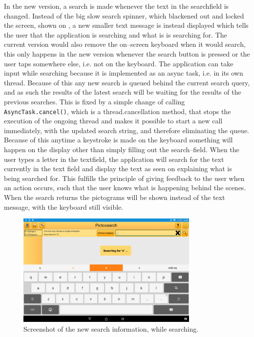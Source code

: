 In the new version, a search is made whenever the text in the searchfield is changed.
Instead of the big slow search spinner, which blackened out and locked the screen, shown on , a new smaller text message is instead displayed which tells the user that the application is searching and what is is searching for.
The current version would also remove the on--screen keyboard when it would search, this only happens in the new version whenever the search button is pressed or the user taps somewhere else, i.e. not on the keyboard.
The application can take input while searching because it is implemented as an async task, i.e. in its own thread.
Because of this any new search is queued behind the current search query, and as such the results of the latest search will be waiting for the results of the previous searches.
This is fixed by a simple change of calling \texttt{AsyncTask.cancel()}, which is a thread.cancellation method, that stops the execution of the ongoing thread and makes it possible to start a new call immediately, with the updated search string, and therefore eliminating the queue.
Because of this anytime a keystroke is made on the keyboard something will happen on the display other than simply filling out the search--field.
When the user types a letter in the textfield, the application will search for the text currently in the text field and display the text as seen on  explaining what is being searched for.
This fulfills the principle of giving feedback to the user when an action occurs, such that the user knows what is happening behind the scenes.
When the search returns the pictograms will be shown instead of the text message, with the keyboard still visible.

\begin{figure}[h]
    \centering
    \includegraphics[width=0.8\textwidth]{figures/img/screenshots/new_dialog.png}
    \caption{Screenshot of the new search information, while searching.}\label{fig:screenshot_newsearch}
\end{figure}

